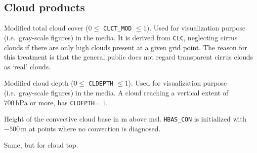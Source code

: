 


\subsection{Cloud products}
\begin{description}[leftmargin=3.0cm,style=sameline]
  \item [CLCT\_MOD] Modified total cloud cover ($0 \leq$ \texttt{CLCT\_MOD} $\leq 1$). Used for visualization purpose 
                    (i.e.\ gray-scale figures) in the media. It is derived from \texttt{CLC}, neglecting cirrus clouds if 
                    there are only high clouds present at a given grid point. The reason for this treatment is that 
                    the general public does not regard transparent cirrus clouds as `real' clouds.
  \item [CLDEPTH]   Modified cloud depth ($0 \leq$ \texttt{CLDEPTH} $\leq 1$). Used for visualization purpose (i.e.\ gray-scale figures) 
                    in the media. A cloud reaching a vertical extent of $700\,\mathrm{hPa}$ or more, has \texttt{CLDEPTH}= $1$.
  \item [HBAS\_CON] Height of the convective cloud base in m above msl. \texttt{HBAS\_CON} is initialized with $-500\,\mathrm{m}$ 
                    at points where no convection is diagnosed.
  \item [HTOP\_CON] Same, but for cloud top.
\end{description}


